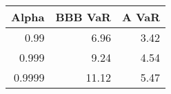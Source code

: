 \begin{tabular}{rrr}
\toprule
 Alpha &  BBB VaR &  A VaR \\
\midrule
  0.99 &      6.96 &    3.42 \\
  0.999 &      9.24 &    4.54 \\
  0.9999 &     11.12 &    5.47 \\
\bottomrule
\end{tabular}
